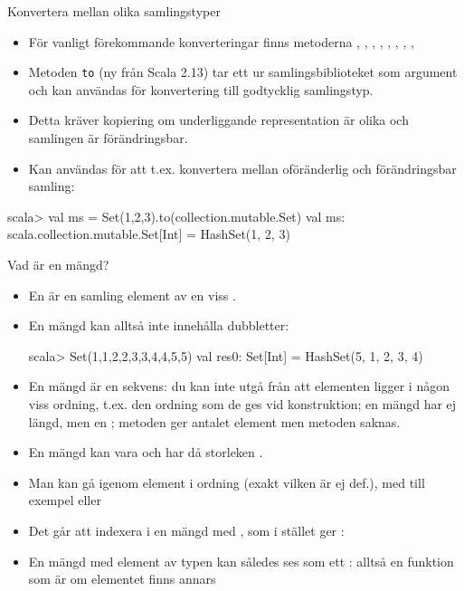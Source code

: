 \begin{Slide}{Konvertera mellan olika samlingstyper}
\begin{itemize}
\item För vanligt förekommande konverteringar finns metoderna , , , , , , , , 
\item Metoden \texttt{to} (ny från Scala 2.13) tar ett  ur samlingsbiblioteket som argument och kan användas för konvertering till godtycklig samlingstyp.
\item Detta kräver kopiering om underliggande representation är olika och samlingen är förändringsbar.
\item Kan användas för att t.ex. konvertera mellan oföränderlig och förändringsbar samling:
\end{itemize}
\begin{REPLnonum}
scala> val ms = Set(1,2,3).to(collection.mutable.Set)
val ms: scala.collection.mutable.Set[Int] = HashSet(1, 2, 3)
\end{REPLnonum}
\end{Slide}




\begin{Slide}{Vad är en mängd?}\SlideFontSmall
\begin{itemize}
\item En  är en samling  element av en viss .
\item En mängd kan alltså inte innehålla dubbletter:
\begin{REPLnonum}
scala> Set(1,1,2,2,3,3,4,4,5,5)
val res0: Set[Int] = HashSet(5, 1, 2, 3, 4)
\end{REPLnonum}
\pause
\item En mängd är   en sekvens: du kan inte utgå från att elementen ligger i någon viss ordning, t.ex. den ordning som de ges vid konstruktion; en mängd har ej längd, men en ; metoden  ger antalet element men metoden  saknas.
\item En mängd kan vara  och har då storleken .
\pause
\item Man kan gå igenom element i  ordning (exakt vilken är ej def.), med till exempel  eller 
\pause
\item Det går  att indexera i en mängd med , som i stället ger : 
\item En mängd  med element av typen  kan således ses som ett : alltså en funktion  som är  om elementet finns annars 
\end{itemize}
\end{Slide}


